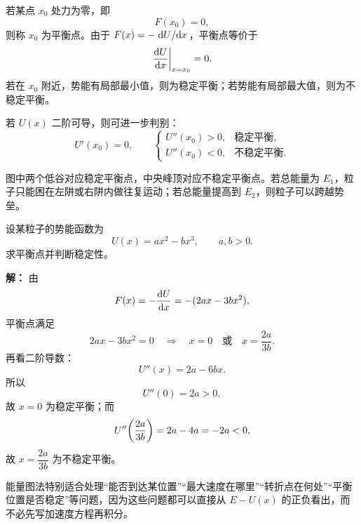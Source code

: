\begin{definition}[平衡点与稳定性]
若某点 $x_0$ 处力为零，即
\[
F(x_0)=0,
\]
则称 $x_0$ 为平衡点。由于 $F(x)=-\dv*{U}{x}$，平衡点等价于
\[
\dv{U}{x}\bigg|_{x=x_0}=0.
\]
若在 $x_0$ 附近，势能有局部最小值，则为稳定平衡；若势能有局部最大值，则为不稳定平衡。
\end{definition}

若 $U(x)$ 二阶可导，则可进一步判别：
\[
U'(x_0)=0,
\qquad
\begin{cases}
U''(x_0)>0, & \text{稳定平衡},\\[4pt]
U''(x_0)<0, & \text{不稳定平衡}.
\end{cases}
\]

\begin{center}
\end{center}

图中两个低谷对应稳定平衡点，中央峰顶对应不稳定平衡点。若总能量为 $E_1$，粒子只能困在左阱或右阱内做往复运动；若总能量提高到 $E_2$，则粒子可以跨越势垒。

\begin{example}[由势能图判断运动]
设某粒子的势能函数为
\[
U(x)=ax^2-bx^3,\qquad a,b>0.
\]
求平衡点并判断稳定性。

\textbf{解：}
由
\[
F(x)=-\dv{U}{x}=-(2ax-3bx^2),
\]
平衡点满足
\[
2ax-3bx^2=0
\quad\Longrightarrow\quad
x=0 \quad\text{或}\quad x=\frac{2a}{3b}.
\]
再看二阶导数：
\[
U''(x)=2a-6bx.
\]
所以
\[
U''(0)=2a>0,
\]
故 $x=0$ 为稳定平衡；而
\[
U''\qty(\frac{2a}{3b})=2a-4a=-2a<0,
\]
故 $x=\dfrac{2a}{3b}$ 为不稳定平衡。
\end{example}

\begin{remark}
能量图法特别适合处理“能否到达某位置”“最大速度在哪里”“转折点在何处”“平衡位置是否稳定”等问题，因为这些问题都可以直接从 $E-U(x)$ 的正负看出，而不必先写加速度方程再积分。
\end{remark}

